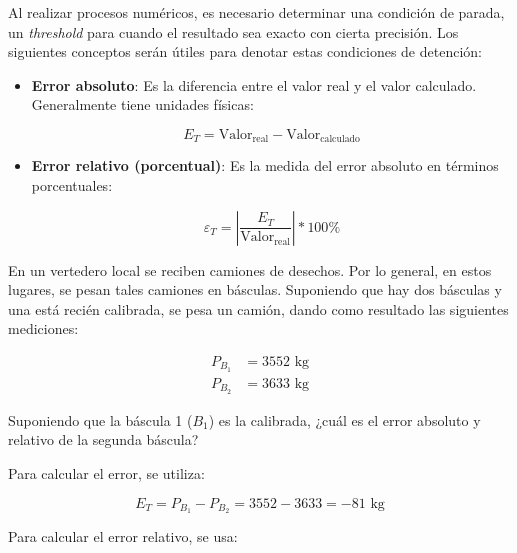 Al realizar procesos numéricos, es necesario determinar una condición de
parada, un \emph{threshold} para cuando el resultado sea exacto con
cierta precisión. Los siguientes conceptos serán útiles para denotar
estas condiciones de detención:

\begin{itemize}
    \item
        \textbf{Error absoluto}: Es la diferencia entre el valor real y el
        valor calculado. Generalmente tiene unidades físicas:

        \begin{equation*}{
                E_T = \text{Valor}_{\text{real}} - \text{Valor}_{\text{calculado}}
        }\end{equation*}
    \item
        \textbf{Error relativo (porcentual)}: Es la medida del error absoluto
        en términos porcentuales:

        \begin{equation*}{
                \varepsilon_{T} = \left| {\frac{E_T}{\text{Valor}_{\text{real}}}} \right| * 100 \%
        }\end{equation*}
\end{itemize}


\begin{ex}

    En un vertedero local se reciben camiones de desechos. Por lo general,
    en estos lugares, se pesan tales camiones en básculas. Suponiendo que
    hay dos básculas y una está recién calibrada, se pesa un camión, dando
    como resultado las siguientes mediciones:

    \begin{eqnarray*}
        P_{B_1} &= 3552\text{ kg}\\
        P_{B_2} &= 3633\text{ kg}
    \end{eqnarray*}

    Suponiendo que la báscula 1 (\(B_1\)) es la calibrada, ¿cuál es el error
    absoluto y relativo de la segunda báscula?

    \begin{solution}
        Para calcular el error, se utiliza:

        \begin{equation*}{
                E_T = P_{B_1} - P_{B_2} = 3552 - 3633 = -81 \text{ kg}
        }\end{equation*}

        Para calcular el error relativo, se usa:

        \begin{center}
        \end{center}

    \end{solution}


\end{ex}


